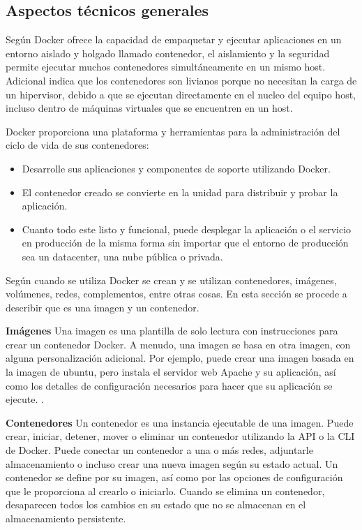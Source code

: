 \subsection{Aspectos técnicos generales}

Según \textcite{Docker2018} Docker ofrece la capacidad de empaquetar y ejecutar aplicaciones en un entorno aislado y holgado llamado contenedor, el aislamiento y la seguridad permite ejecutar muchos contenedores simultáneamente en un mismo host. Adicional \textcite{Docker2018} indica que los contenedores son livianos porque no necesitan la carga de un hipervisor, debido a que se ejecutan directamente en el nucleo del equipo host, incluso dentro de máquinas virtuales que se encuentren en un host.

Docker proporciona una plataforma y herramientas para la administración del ciclo de vida de sus contenedores:
\begin{itemize}
    \item Desarrolle sus aplicaciones y componentes de soporte utilizando Docker.
    \item El contenedor creado se convierte en la unidad para distribuir y probar la aplicación.
    \item Cuanto todo este listo y funcional, puede desplegar la aplicación o el servicio en producción de la misma forma sin importar que el entorno de producción sea un datacenter, una nube pública o privada.
\end{itemize}

Según \textcite{Docker2018} cuando se utiliza Docker se crean y se utilizan contenedores, imágenes, volúmenes, redes, complementos, entre otras cosas. En esta sección se procede a describir que es una imagen y un contenedor.

\textbf{Imágenes}
Una imagen es una plantilla de solo lectura con instrucciones para crear un contenedor Docker. A menudo, una imagen se basa en otra imagen, con alguna personalización adicional. Por ejemplo, puede crear una imagen basada en la imagen de ubuntu, pero instala el servidor web Apache y su aplicación, así como los detalles de configuración necesarios para hacer que su aplicación se ejecute. \parencite{Docker2018}.

\textbf{Contenedores}
Un contenedor es una instancia ejecutable de una imagen. Puede crear, iniciar, detener, mover o eliminar un contenedor utilizando la API o la CLI de Docker. Puede conectar un contenedor a una o más redes, adjuntarle almacenamiento o incluso crear una nueva imagen según su estado actual. Un contenedor se define por su imagen, así como por las opciones de configuración que le proporciona al crearlo o iniciarlo. Cuando se elimina un contenedor, desaparecen todos los cambios en su estado que no se almacenan en el almacenamiento persistente. \parencite{Docker2018}


